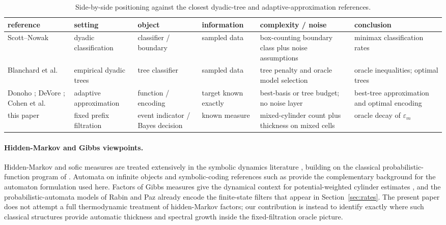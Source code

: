 \begin{table}[ht]
\centering
{\scriptsize
\setlength{\tabcolsep}{3pt}
\begin{tabular}{@{}>{\raggedright\arraybackslash}p{1.00in}>{\raggedright\arraybackslash}p{0.70in}>{\raggedright\arraybackslash}p{0.76in}>{\raggedright\arraybackslash}p{0.82in}>{\raggedright\arraybackslash}p{1.18in}>{\raggedright\arraybackslash}p{1.00in}@{}}
\toprule
reference & setting & object & information & complexity / noise & conclusion \\
\midrule
Scott--Nowak \cite{ScottNowak2006} &
dyadic classification &
classifier / boundary &
sampled data &
box-counting boundary class plus noise assumptions &
minimax classification rates \\
Blanchard et al.\ \cite{BlanchardSchaferRozenholcMuller2007} &
empirical dyadic trees &
tree classifier &
sampled data &
tree penalty and oracle model selection &
oracle inequalities; optimal trees \\
Donoho \cite{Donoho1997}; DeVore \cite{DeVore1998}; Cohen et al.\ \cite{CohenDahmenDaubechiesDeVore2001} &
adaptive approximation &
function / encoding &
target known exactly &
best-basis or tree budget; no noise layer &
best-tree approximation and optimal encoding \\
this paper &
fixed prefix filtration &
event indicator / Bayes decision &
known measure &
mixed-cylinder count plus thickness on mixed cells &
oracle decay of $\varepsilon_m$ \\
\bottomrule
\end{tabular}
\par}
\caption{Side-by-side positioning against the closest dyadic-tree and adaptive-approximation references.}
\label{tab:dyadic-comparison}
\end{table}

\paragraph{Hidden-Markov and Gibbs viewpoints.}
Hidden-Markov and sofic measures are treated extensively in the symbolic
dynamics literature \cite{BoylePetersenHMP,Verbitskiy2011}, building on the
classical probabilistic-function program of
\cite{Blackwell1957,Heller1965,BaumPetrie1966}.  Automata on infinite objects
and symbolic-coding references such as
\cite{Thomas1990,PerrinPin2004,Kitchens1998} provide the complementary
background for the automaton formulation used here.  Factors of Gibbs measures
give the dynamical context for potential-weighted cylinder estimates
\cite{PollicottKempton2016}, and the probabilistic-automata models of Rabin and
Paz \cite{Rabin1963,Paz1971} already encode the finite-state filters that
appear in Section~\ref{sec:rates}.  The present paper does not attempt a full
thermodynamic treatment of hidden-Markov factors; our contribution is instead to
identify exactly where such classical structures provide automatic thickness and
spectral growth inside the fixed-filtration oracle picture.

